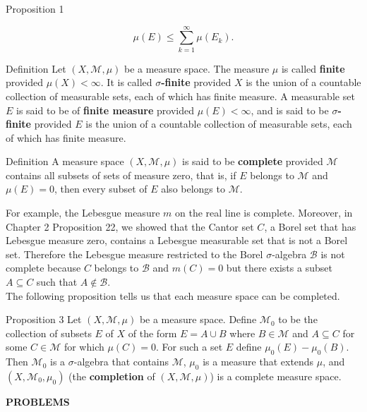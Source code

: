 \begin{flushleft}
\begin{namedthm*}{Proposition 1}
\begin{enumerate}[\indent {}]
			\[
				\mu(E)\le\sum_{k=1}^\infty\mu(E_k).	
			\]
		\end{enumerate}
	\end{namedthm*}
	\begin{namedthm*}{Definition}
		Let $(X,\mathcal{M},\mu)$ be a measure space. 
		The measure $\mu$ is called \textbf{finite} provided $\mu(X)<\infty$. 
		It is called \textbf{$\sigma$-finite} provided $X$ is the union of a countable collection of measurable sets, each of which has finite measure.
		A measurable set $E$ is said to be of \textbf{finite measure} provided $\mu(E)<\infty$, and is said to be \textbf{$\sigma$-finite} provided $E$ is the union of a countable collection of measurable sets, each of which has finite measure.
	\end{namedthm*}
	\begin{namedthm*}{Definition}
		A measure space $(X,\mathcal{M},\mu)$ is said to be \textbf{complete} provided $\mathcal{M}$ contains all subsets of sets of measure zero, that is, if $E$ belongs to $\mathcal{M}$ and $\mu(E)=0$, then every subset of $E$ also belongs to $\mathcal{M}$.
	\end{namedthm*}
	For example, the Lebesgue measure $m$ on the real line is complete. 
	Moreover, in Chapter 2 Proposition 22, we showed that the Cantor set $C$, a Borel set that has Lebesgue measure zero, contains a Lebesgue measurable set that is not a Borel set.
	Therefore the Lebesgue measure restricted to the Borel $\sigma$-algebra $\mathcal{B}$ is not complete because $C$ belongs to $\mathcal{B}$ and $m(C)=0$ but there exists a subset $A\subseteq C$ such that $A\notin\mathcal{B}$.\\
	\medskip
	The following proposition tells us that each measure space can be completed.
	\begin{namedthm*}{Proposition 3}
		Let $(X,\mathcal{M},\mu)$ be a measure space.
		Define $\mathcal{M}_0$ to be the collection of subsets $E$ of $X$ of the form $E=A\cup B$ where $B\in\mathcal{M}$ and $A\subseteq C$ for some $C\in\mathcal{M}$ for which $\mu(C)=0$.
		For such a set $E$ define $\mu_0(E)-\mu_0(B)$. 
		Then $\mathcal{M}_0$ is a $\sigma$-algebra that contains $\mathcal{M}$, $\mu_0$ is a measure that extends $\mu$, and $(X,\mathcal{M}_0,\mu_0)$ (the \textbf{completion} of $(X,\mathcal{M},\mu)$) is a complete measure space.
	\end{namedthm*}
\end{flushleft}
\begin{center}
	\textbf{PROBLEMS}
\end{center}
